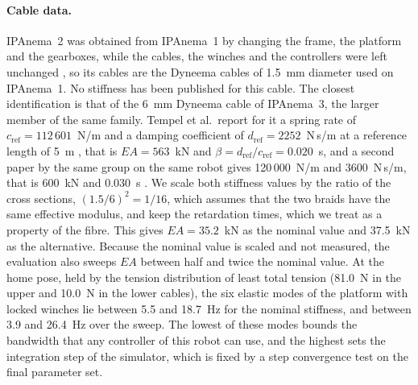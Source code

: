 \documentclass[10pt]{article}
\begin{document}
\paragraph{Cable data.} IPAnema~2 was obtained from IPAnema~1 by changing the frame, the platform and the gearboxes, while the cables, the winches and the controllers were left unchanged \citep{pott2013ipanema}, so its cables are the Dyneema cables of 1.5~mm diameter used on IPAnema~1. No stiffness has been published for this cable. The closest identification is that of the 6~mm Dyneema cable of IPAnema~3, the larger member of the same family. Tempel et al.\ report for it a spring rate of $c_{\mathrm{ref}}=112\,601$~N/m and a damping coefficient of $d_{\mathrm{ref}}=2252$~N\,s/m at a reference length of 5~m \citep{tempel2015iftomm}, that is $EA=563$~kN and $\beta=d_{\mathrm{ref}}/c_{\mathrm{ref}}=0.020$~s, and a second paper by the same group on the same robot gives 120\,000~N/m and 3600~N\,s/m, that is 600~kN and 0.030~s \citep{tempel2015amm}. We scale both stiffness values by the ratio of the cross sections, $(1.5/6)^2=1/16$, which assumes that the two braids have the same effective modulus, and keep the retardation times, which we treat as a property of the fibre. This gives $EA=35.2$~kN as the nominal value and 37.5~kN as the alternative. Because the nominal value is scaled and not measured, the evaluation also sweeps $EA$ between half and twice the nominal value. At the home pose, held by the tension distribution of least total tension (81.0~N in the upper and 10.0~N in the lower cables), the six elastic modes of the platform with locked winches lie between 5.5 and 18.7~Hz for the nominal stiffness, and between 3.9 and 26.4~Hz over the sweep. The lowest of these modes bounds the bandwidth that any controller of this robot can use, and the highest sets the integration step of the simulator, which is fixed by a step convergence test on the final parameter set.
\end{document}
